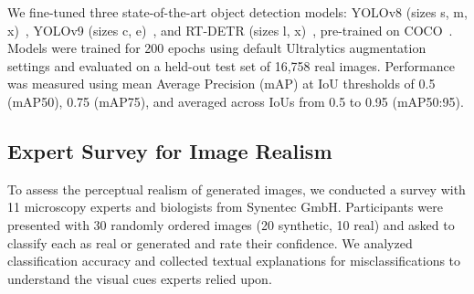 We fine-tuned three state-of-the-art object detection models: YOLOv8 (sizes s, m, x)~\cite{jocher_ultralytics_2023}, YOLOv9 (sizes c, e)~\cite{Wang2024YOLOv9LW}, and RT-DETR (sizes l, x)~\cite{Lv2023DETRsBY}, pre-trained on COCO~\cite{tsung-yi_lin_microsoft_2014}.
Models were trained for 200 epochs using default Ultralytics augmentation settings and evaluated on a held-out test set of 16,758 real images.
Performance was measured using mean Average Precision (mAP) at IoU thresholds of 0.5 (mAP\@50), 0.75 (mAP\@75), and averaged across IoUs from 0.5 to 0.95 (mAP\@50:95).

\subsection{Expert Survey for Image Realism}
\label{subsec:expert-survey-for-image-realism}
To assess the perceptual realism of generated images, we conducted a survey with 11 microscopy experts and biologists from Synentec GmbH\@.
Participants were presented with 30 randomly ordered images (20 synthetic, 10 real) and asked to classify each as real or generated and rate their confidence.
We analyzed classification accuracy and collected textual explanations for misclassifications to understand the visual cues experts relied upon.